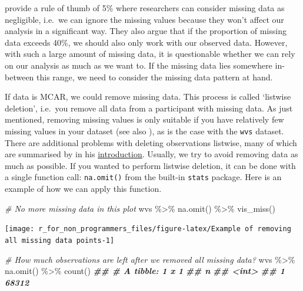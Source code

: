 \documentclass[
]{book}
\newenvironment{Shaded}{\begin{snugshade}}{\end{snugshade}}
\newcommand{\CommentTok}[1]{\textcolor[rgb]{0.56,0.35,0.01}{\textit{#1}}}
\newcommand{\DocumentationTok}[1]{\textcolor[rgb]{0.56,0.35,0.01}{\textbf{\textit{#1}}}}
\newcommand{\FunctionTok}[1]{\textcolor[rgb]{0.00,0.00,0.00}{#1}}
\newcommand{\NormalTok}[1]{#1}
\newcommand{\SpecialCharTok}[1]{\textcolor[rgb]{0.00,0.00,0.00}{#1}}
\begin{document}
\citet{jakobsen-et-al-2017} provide a rule of thumb of 5\% where researchers can consider missing data as negligible, i.e.~we can ignore the missing values because they won't affect our analysis in a significant way. They also argue that if the proportion of missing data exceeds 40\%, we should also only work with our observed data. However, with such a large amount of missing data, it is questionable whether we can rely on our analysis as much as we want to. If the missing data lies somewhere in-between this range, we need to consider the missing data pattern at hand.

If data is MCAR, we could remove missing data. This process is called `listwise deletion', i.e.~you remove all data from a participant with missing data. As just mentioned, removing missing values is only suitable if you have relatively few missing values in your dataset (see also \citet{schafer-1999}), as is the case with the \texttt{wvs} dataset. There are additional problems with deleting observations listwise, many of which are summarised by \citet{van-buuren-2018} in his \href{https://stefvanbuuren.name/fimd/sec-simplesolutions.html}{introduction}. Usually, we try to avoid removing data as much as possible. If you wanted to perform listwise deletion, it can be done with a single function call: \texttt{na.omit()} from the built-in \texttt{stats} package. Here is an example of how we can apply this function.

\begin{Shaded}
\begin{Highlighting}[]
\CommentTok{\# No more missing data in this plot}
\NormalTok{wvs }\SpecialCharTok{\%\textgreater{}\%} \FunctionTok{na.omit}\NormalTok{() }\SpecialCharTok{\%\textgreater{}\%} \FunctionTok{vis\_miss}\NormalTok{()}
\end{Highlighting}
\end{Shaded}

\begin{center}\texttt{[image: r\_for\_non\_programmers\_files/figure-latex/Example of removing all missing data points-1]} \end{center}

\begin{Shaded}
\begin{Highlighting}[]

\CommentTok{\# How much observations are left after we removed all missing data?}
\NormalTok{wvs }\SpecialCharTok{\%\textgreater{}\%} \FunctionTok{na.omit}\NormalTok{() }\SpecialCharTok{\%\textgreater{}\%} \FunctionTok{count}\NormalTok{()}
\DocumentationTok{\#\# \# A tibble: 1 x 1}
\DocumentationTok{\#\#       n}
\DocumentationTok{\#\#   \textless{}int\textgreater{}}
\DocumentationTok{\#\# 1 68312}
\end{Highlighting}
\end{Shaded}
\end{document}
